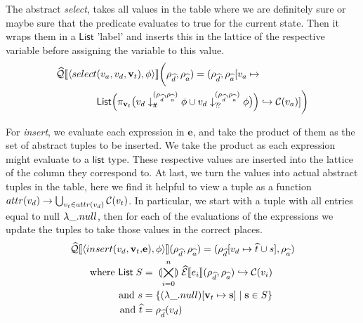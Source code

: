 The abstract \textit{select}, takes all values in the table where we are definitely sure or maybe sure that the predicate evaluates to true for the current state.
Then it wraps them in a $\mathsf{List}$ 'label' and inserts this in the lattice of the respective variable before assigning the variable to this value.
\begin{align}
\begin{split} \nonumber
    \widehat{\mathcal{Q}}\llbracket \langle select&(v_a, v_d, \mathbf{v}_t), \phi \rangle \rrbracket\biggl(\rho_{\widehat{d}}, \rho_{\widehat{a}})
    = (\rho_{\widehat{d}}, \rho_{\widehat{a}}[v_a \mapsto \\
    &\mathsf{List} \Bigl( \pi_{\mathbf{v}_t} \bigl(v_d \downarrow_{t\!t}^{(\rho_{\widehat{d}}, \rho_{\widehat{a}})} \phi \cup v_d \downarrow_{?\!?}^{(\rho_{\widehat{d}}, \rho_{\widehat{a}})} \phi \bigr) \Bigr) \hookrightarrow \mathcal{C}(v_a) ]\biggr)
\end{split}\\
\end{align}

For \textit{insert}, we evaluate each expression in $\mathbf{e}$, and take the product of them as the set of abstract tuples to be inserted.
We take the product as each expression might evaluate to a $\mathsf{list}$ type.
These respective values are inserted into the lattice of the column they correspond to.
At last, we turn the values into actual abstract tuples in the table, here we find it helpful to view a tuple as a function $attr(v_d) \rightarrow \bigcup_{v_t \in attr(v_d)}\mathcal{C}(v_t)$.
In particular, we start with a tuple with all entries equal to null $\lambda\_.null$, then for each of the evaluations of the expressions we update the tuples to take those values in the correct places.
\begin{align}
    \widehat{\mathcal{Q}}\llbracket \langle insert(v_d, \mathbf{v}_t, &\mathbf{e}), \phi \rangle \rrbracket(\rho_{\widehat{d}}, \rho_{\widehat{a}}) = (\rho_{\widehat{d}}[v_d\mapsto \widehat{t}\cup s], \rho_{\widehat{a}}) \nonumber \\
    \text{where } \mathsf{List} \; S &= \;\llparenthesis\bigtimes_{i = 0}^{n}\rrparenthesis\; \widehat{\mathcal{E}}\llbracket e_i \rrbracket(\rho_{\widehat{d}}, \rho_{\widehat{a}}) \hookrightarrow \mathcal{C}(v_i) \nonumber\\
    \text{and } s &= \left\{ (\lambda\_.null)[\mathbf{v}_t \mapsto \mathbf{s}] \;\middle|\; \mathbf{s} \in S\right\} \nonumber\\
    \text{and } \widehat{t}&=\rho_{\widehat{d}}(v_d)
\end{align}

